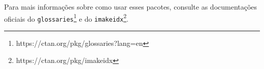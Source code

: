 \begin{alineas}
\end{alineas}

Para mais informações sobre como usar esses pacotes, consulte as documentações oficiais do \texttt{glossaries}\footnote{https://ctan.org/pkg/glossaries?lang=en} e do \texttt{imakeidx}\footnote{https://ctan.org/pkg/imakeidx}.
